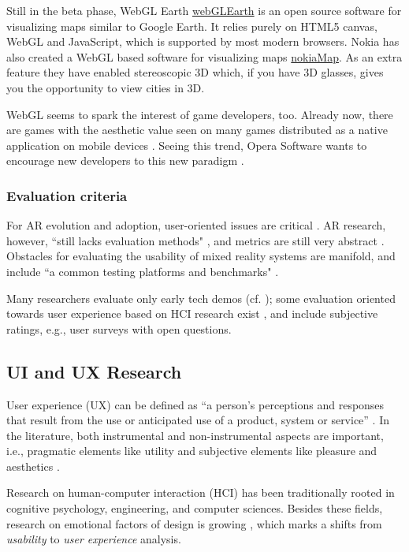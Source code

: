 \documentclass[12pt,journal,compsoc]{IEEEtran}
\begin{document}
Still in the beta phase, WebGL Earth \url{webGLEarth} is an open source software for visualizing maps similar to Google Earth. It relies purely on HTML5 canvas, WebGL and JavaScript, which is supported by most modern browsers.
	Nokia has also created a WebGL based software for visualizing maps \url{nokiaMap}. As an extra feature they have enabled stereoscopic 3D which, if you have 3D glasses, gives you the opportunity to view cities in 3D. 

WebGL seems to spark the interest of game developers, too. Already now, there are games with the aesthetic value seen on many games distributed as a native application on mobile devices \cite{Airscape}. Seeing this trend, Opera Software wants to encourage new developers to this new paradigm \cite{OperaSeminar}.


\subsubsection{Evaluation criteria}
For AR evolution and adoption, user-oriented issues are critical \cite{Olsson2011b}. AR research, however, “still lacks evaluation methods" \cite{Gandy2010}, and metrics are still very abstract \cite{Olsson2011a}. Obstacles for evaluating the usability of mixed reality systems are manifold, and include “a common testing platforms and benchmarks" \cite{Bach2004}.

Many researchers evaluate only early tech demos (cf. \cite{Duenster2008}); some evaluation oriented towards user experience based on HCI research exist \cite{Bach2004}, and include subjective ratings, e.g., user surveys with open questions.

\subsection{UI and UX Research}
User experience (UX) can be defined as “a person's perceptions and responses that result from the use or anticipated use of a product, system or service” \cite{FDIS2009}. In the literature,  both instrumental and non-instrumental aspects are important, i.e., pragmatic elements like utility and subjective elements like pleasure and aesthetics \cite{Hassenzahl2006}. 

Research on human-computer interaction (HCI) has been traditionally rooted in cognitive psychology, engineering, and computer sciences. Besides these fields, research on emotional factors of design is growing \cite{Norman2002}, which marks a shifts from \textit{usability} to \textit{user experience} analysis.
\end{document}
